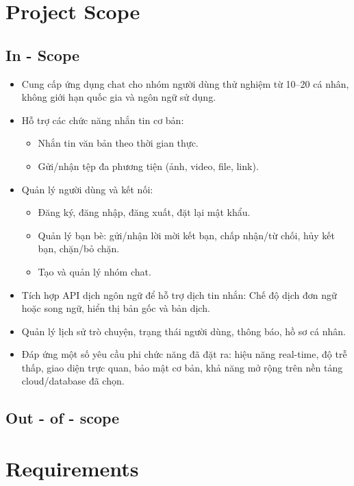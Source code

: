 \documentclass[a4paper, 12pt]{article}
\begin{document}
	\section{Project Scope}
	\subsection{In - Scope}
	\begin{itemize}
		\item Cung cấp ứng dụng chat cho nhóm người dùng thử nghiệm từ 10--20 cá nhân, không giới hạn quốc gia và ngôn ngữ sử dụng.
		
		\item Hỗ trợ các chức năng nhắn tin cơ bản:
		\begin{itemize}
			\item Nhắn tin văn bản theo thời gian thực.
			\item Gửi/nhận tệp đa phương tiện (ảnh, video, file, link).
		\end{itemize}
		
		\item Quản lý người dùng và kết nối:
		\begin{itemize}
			\item Đăng ký, đăng nhập, đăng xuất, đặt lại mật khẩu.
			\item Quản lý bạn bè: gửi/nhận lời mời kết bạn, chấp nhận/từ chối, hủy kết bạn, chặn/bỏ chặn.
			\item Tạo và quản lý nhóm chat.
		\end{itemize}
		
		\item Tích hợp API dịch ngôn ngữ để hỗ trợ dịch tin nhắn:  Chế độ dịch đơn ngữ hoặc song ngữ, hiển thị bản gốc và bản dịch.
	
		
		\item Quản lý lịch sử trò chuyện, trạng thái người dùng, thông báo, hồ sơ cá nhân.
		
		\item Đáp ứng một số yêu cầu phi chức năng đã đặt ra: hiệu năng real-time, độ trễ thấp, giao diện trực quan, bảo mật cơ bản, khả năng mở rộng trên nền tảng cloud/database đã chọn.
	\end{itemize}
	\subsection{Out - of - scope}


	\section{Requirements}
	
\end{document}
